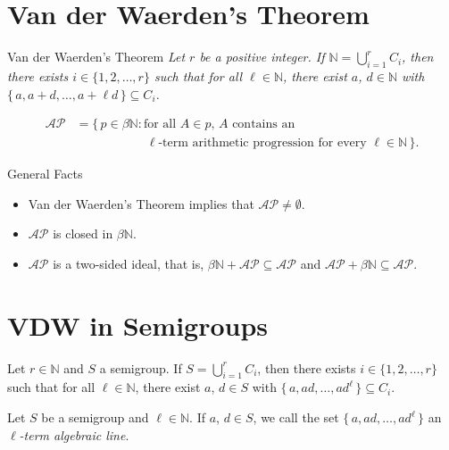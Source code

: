 \documentclass{beamer}
\newcommand{\bbN}{\mathbb{N}}
\begin{document}
\section{Van der Waerden's Theorem}
\begin{frame}
  \begin{block}{Van der Waerden's Theorem}
    \textsl{Let $r$ be a positive integer.
    If $\bbN = \bigcup_{i=1}^r C_i$, then there exists $i \in \{1, 2, \ldots, r\}$ such that for all $\ell \in \bbN$, there exist $a$, $d \in \bbN$ with $\{\, a, a+d, \ldots, a + \ell d \,\} \subseteq
    C_i$.} 
  \end{block}

  \pause

  \begin{definition}
    \vspace{-1em}
    \begin{align*}
      \mathcal{AP} &= \{\, p \in \beta \bbN : \mbox{for all $A \in p$, $A$ contains an} \\
      &\hspace{5em}\mbox{ $\ell$-term arithmetic progression for every $\ell \in \bbN$} \,\}.
    \end{align*}
  \end{definition}

  \pause

  \begin{block}{General Facts}
    \begin{itemize}
      \item Van der Waerden's Theorem implies that $\mathcal{AP} \ne  \emptyset$. 
        \pause

      \item $\mathcal{AP}$ is closed in $\beta\bbN$. 
        \pause

      \item $\mathcal{AP}$ is a two-sided ideal, that is, $\beta\bbN +       \mathcal{AP} \subseteq \mathcal{AP}$ and $\mathcal{AP} + \beta\bbN \subseteq \mathcal{AP}$.
    \end{itemize}
  \end{block}
\end{frame}

\section{VDW in Semigroups}
\begin{frame}
  \begin{theorem}
    Let $r \in \bbN$ and $S$ a semigroup.
    If $S = \bigcup_{i=1}^r C_i$, then there exists $i \in \{1, 2,
    \ldots, r \}$ such that for all $\ell \in \bbN$, there exist $a$,
    $d \in S$ with $\{\, a, ad, \ldots, ad^\ell \,\} \subseteq C_i$. 
  \end{theorem}

  \pause

  \begin{definition}
    Let $S$ be a semigroup and $\ell \in \bbN$. 
    If $a$, $d \in S$, we call the set $\{\, a, ad, \ldots, ad^\ell
    \,\}$ an \textsl{\mbox{$\ell$-term} algebraic line}.
  \end{definition}
\end{frame}
\end{document}
